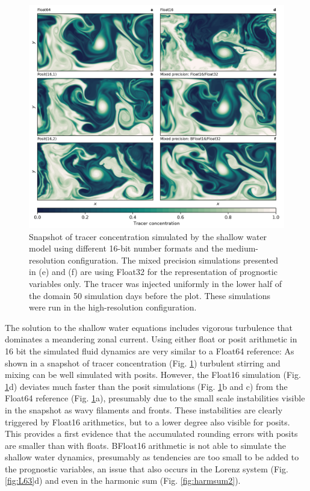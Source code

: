 \documentclass[draft]{agujournal2019}
\begin{document}
\begin{figure}
\includegraphics[width=1\textwidth]{../plots/snapshot.png}
\caption{Snapshot of tracer concentration simulated by the shallow water model using different 16-bit number formats and the medium-resolution configuration. The mixed precision simulations presented in (e) and (f) are using Float32 for the representation of prognostic variables only. The tracer was injected uniformly in the lower half of the domain 50 simulation days before the plot. These simulations were run in the high-resolution configuration.}
\label{fig:snapshot}
\end{figure}

The solution to the shallow water equations includes vigorous turbulence that dominates a meandering zonal current. Using either float or posit arithmetic in 16 bit the simulated fluid dynamics are very similar to a Float64 reference: As shown in a snapshot of tracer concentration (Fig. \ref{fig:snapshot}) turbulent stirring and mixing can be well simulated with posits. However, the Float16 simulation (Fig. \ref{fig:snapshot}d) deviates much faster than the posit simulations (Fig. \ref{fig:snapshot}b and c) from the Float64 reference (Fig. \ref{fig:snapshot}a), presumably due to the small scale instabilities visible in the snapshot as wavy filaments and fronts. These instabilities are clearly triggered by Float16 arithmetics, but to a lower degree also visible for posits. This provides a first evidence that the accumulated rounding errors with posits are smaller than with floats. BFloat16 arithmetic is not able to simulate the shallow water dynamics, presumably as tendencies are too small to be added to the prognostic variables, an issue that also occurs in the Lorenz system (Fig. \ref{fig:L63}d) and even in the harmonic sum (Fig. \ref{fig:harmsum2}).
\end{document}
